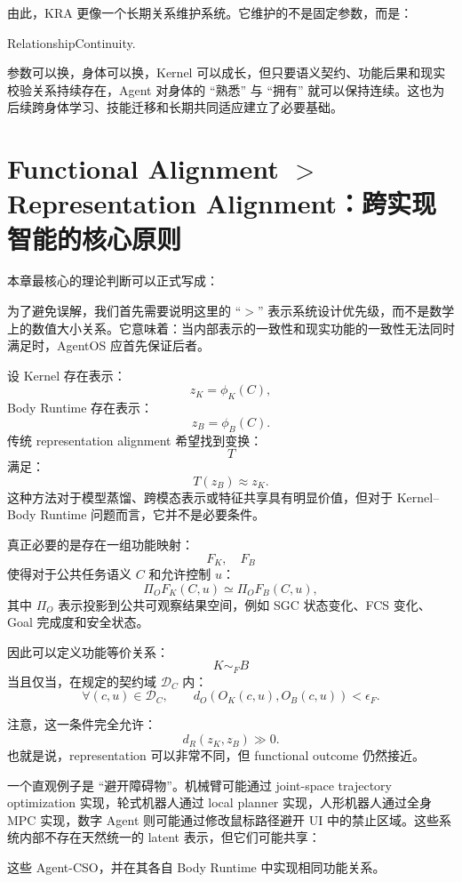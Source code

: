 由此，KRA 更像一个长期关系维护系统。它维护的不是固定参数，而是：
\begin{statementbox}
RelationshipContinuity.
\end{statementbox}
参数可以换，身体可以换，Kernel 可以成长，但只要语义契约、功能后果和现实校验关系持续存在，Agent 对身体的 ``熟悉'' 与 ``拥有'' 就可以保持连续。这也为后续跨身体学习、技能迁移和长期共同适应建立了必要基础。

\section{Functional Alignment $>$ Representation Alignment：跨实现智能的核心原则}

本章最核心的理论判断可以正式写成：
\begin{statementbox}
\centering
{}
\end{statementbox}
为了避免误解，我们首先需要说明这里的 ``$>$'' 表示系统设计优先级，而不是数学上的数值大小关系。它意味着：当内部表示的一致性和现实功能的一致性无法同时满足时，AgentOS 应首先保证后者。

设 Kernel 存在表示：
\[
z_K
=
\phi_K(C),
\]
Body Runtime 存在表示：
\[
z_B
=
\phi_B(C).
\]
传统 representation alignment 希望找到变换：
\[
T
\]
满足：
\[
T(z_B)\approx z_K.
\]
这种方法对于模型蒸馏、跨模态表示或特征共享具有明显价值，但对于 Kernel--Body Runtime 问题而言，它并不是必要条件。

真正必要的是存在一组功能映射：
\[
F_K,\quad F_B
\]
使得对于公共任务语义 $C$ 和允许控制 $u$：
\[
\Pi_O
F_K(C,u)
\simeq
\Pi_O
F_B(C,u),
\]
其中 $\Pi_O$ 表示投影到公共可观察结果空间，例如 SGC 状态变化、FCS 变化、Goal 完成度和安全状态。

因此可以定义功能等价关系：
\[
K
\sim_F
B
\]
当且仅当，在规定的契约域 $\mathcal D_C$ 内：
\[
\forall (c,u)\in\mathcal D_C,
\qquad
d_O(
O_K(c,u),
O_B(c,u)
)
<\epsilon_F.
\]

注意，这一条件完全允许：
\[
d_R(z_K,z_B)\gg 0.
\]
也就是说，representation 可以非常不同，但 functional outcome 仍然接近。

一个直观例子是 ``避开障碍物''。机械臂可能通过 joint-space trajectory optimization 实现，轮式机器人通过 local planner 实现，人形机器人通过全身 MPC 实现，数字 Agent 则可能通过修改鼠标路径避开 UI 中的禁止区域。这些系统内部不存在天然统一的 latent 表示，但它们可能共享：
\begin{statementbox}
\centering
{}
\end{statementbox}
这些 Agent-CSO，并在其各自 Body Runtime 中实现相同功能关系。

